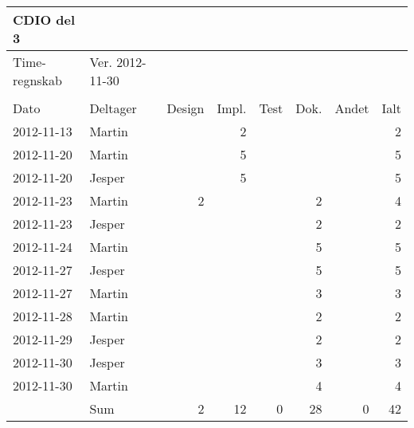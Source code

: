 \begin{table}[htbp]
  \centering
    \begin{tabular}{|l|l|r|r|r|r|r|r|}
    \hline
    CDIO del 3 &       &       &       &       &       &       &  \bigstrut\\
    \hline
    Time-regnskab & Ver. 2012-11-30 &       &       &       &       &       &  \bigstrut\\
    \hline
          &       &       &       &       &       &       &  \bigstrut\\
    \hline
    Dato  & Deltager & Design & Impl. & Test  & Dok.  & Andet & Ialt \bigstrut\\
    \hline
    2012-11-13 & Martin &       & 2     &       &       &       & 2 \bigstrut\\
    \hline
    2012-11-20 & Martin &       & 5     &       &       &       & 5 \bigstrut\\
    \hline
    2012-11-20 & Jesper &       & 5     &       &       &       & 5 \bigstrut\\
    \hline
    2012-11-23 & Martin & 2     &       &       & 2     &       & 4 \bigstrut\\
    \hline
    2012-11-23 & Jesper &       &       &       & 2     &       & 2 \bigstrut\\
    \hline
    2012-11-24 & Martin &       &       &       & 5     &       & 5 \bigstrut\\
    \hline
    2012-11-27 & Jesper &       &       &       & 5     &       & 5 \bigstrut\\
    \hline
    2012-11-27 & Martin &       &       &       & 3     &       & 3 \bigstrut\\
    \hline
    2012-11-28 & Martin &       &       &       & 2     &       & 2 \bigstrut\\
    \hline
    2012-11-29 & Jesper &       &       &       & 2     &       & 2 \bigstrut\\
    \hline
    2012-11-30 & Jesper &       &       &       & 3     &       & 3 \bigstrut\\
    \hline
    2012-11-30 & Martin &       &       &       & 4     &       & 4 \bigstrut\\
    \hline
          & Sum   & 2     & 12    & 0     & 28    & 0     & 42 \bigstrut\\
    \hline
    \end{tabular}%
  \label{tab:addlabel}%
\end{table}%
